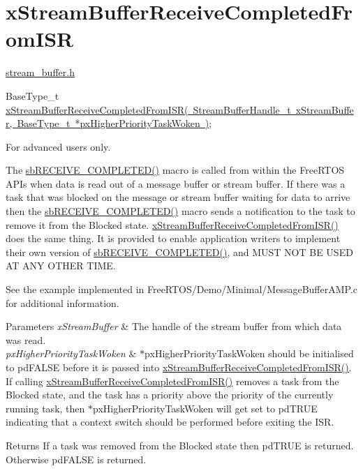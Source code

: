 \hypertarget{group__x_stream_buffer_receive_completed_from_i_s_r}{}\section{x\+Stream\+Buffer\+Receive\+Completed\+From\+I\+SR}
\label{group__x_stream_buffer_receive_completed_from_i_s_r}
\mbox{\hyperlink{stream__buffer_8h}{stream\+\_\+buffer.\+h}}


\begin{DoxyPre}
BaseType\_t \mbox{\hyperlink{stream__buffer_8h_ac12e93e96e0eafbc0e981d00e7275d32}{xStreamBufferReceiveCompletedFromISR( StreamBufferHandle\_t xStreamBuffer, BaseType\_t *pxHigherPriorityTaskWoken )}};
\end{DoxyPre}


For advanced users only.

The \mbox{\hyperlink{stream__buffer_8c_a4d6a29d283acfa2d4ef576476eedc789}{sb\+R\+E\+C\+E\+I\+V\+E\+\_\+\+C\+O\+M\+P\+L\+E\+T\+E\+D()}} macro is called from within the Free\+R\+T\+OS A\+P\+Is when data is read out of a message buffer or stream buffer. If there was a task that was blocked on the message or stream buffer waiting for data to arrive then the \mbox{\hyperlink{stream__buffer_8c_a4d6a29d283acfa2d4ef576476eedc789}{sb\+R\+E\+C\+E\+I\+V\+E\+\_\+\+C\+O\+M\+P\+L\+E\+T\+E\+D()}} macro sends a notification to the task to remove it from the Blocked state. \mbox{\hyperlink{stream__buffer_8h_ac12e93e96e0eafbc0e981d00e7275d32}{x\+Stream\+Buffer\+Receive\+Completed\+From\+I\+S\+R()}} does the same thing. It is provided to enable application writers to implement their own version of \mbox{\hyperlink{stream__buffer_8c_a4d6a29d283acfa2d4ef576476eedc789}{sb\+R\+E\+C\+E\+I\+V\+E\+\_\+\+C\+O\+M\+P\+L\+E\+T\+E\+D()}}, and M\+U\+ST N\+OT BE U\+S\+ED AT A\+NY O\+T\+H\+ER T\+I\+ME.

See the example implemented in Free\+R\+T\+O\+S/\+Demo/\+Minimal/\+Message\+Buffer\+A\+M\+P.\+c for additional information.


\begin{DoxyParams}{Parameters}
{\em x\+Stream\+Buffer} & The handle of the stream buffer from which data was read.\\
\hline
{\em px\+Higher\+Priority\+Task\+Woken} & $\ast$px\+Higher\+Priority\+Task\+Woken should be initialised to pd\+F\+A\+L\+SE before it is passed into \mbox{\hyperlink{stream__buffer_8h_ac12e93e96e0eafbc0e981d00e7275d32}{x\+Stream\+Buffer\+Receive\+Completed\+From\+I\+S\+R()}}. If calling \mbox{\hyperlink{stream__buffer_8h_ac12e93e96e0eafbc0e981d00e7275d32}{x\+Stream\+Buffer\+Receive\+Completed\+From\+I\+S\+R()}} removes a task from the Blocked state, and the task has a priority above the priority of the currently running task, then $\ast$px\+Higher\+Priority\+Task\+Woken will get set to pd\+T\+R\+UE indicating that a context switch should be performed before exiting the I\+SR.\\
\hline
\end{DoxyParams}
\begin{DoxyReturn}{Returns}
If a task was removed from the Blocked state then pd\+T\+R\+UE is returned. Otherwise pd\+F\+A\+L\+SE is returned. 
\end{DoxyReturn}
